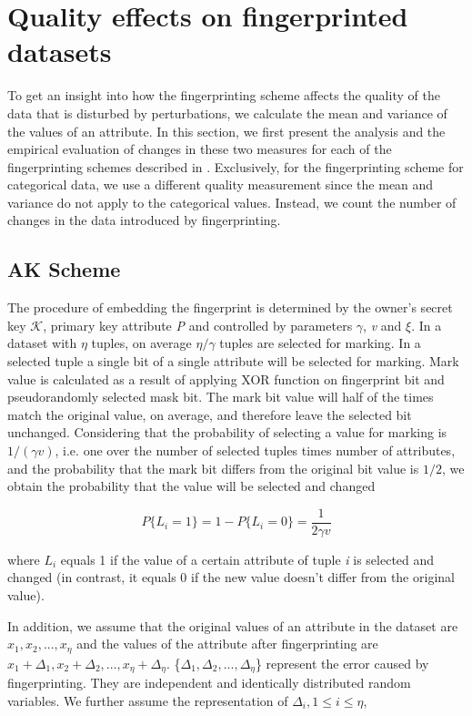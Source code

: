 
\section{Quality effects on fingerprinted datasets}\label{sec:quality}
To get an insight into how the fingerprinting scheme affects the quality of the data that is disturbed by perturbations, we calculate the mean and variance of the values of an attribute. 
In this section, we first present the analysis and the empirical evaluation of changes in these two measures for each of the fingerprinting schemes described in . 
Exclusively, for the fingerprinting scheme for categorical data, we use a different quality measurement since the mean and variance do not apply to the categorical values. 
Instead, we count the number of changes in the data introduced by fingerprinting. 

\subsection{AK Scheme}
The procedure of embedding the fingerprint is determined by the owner's secret key $\mathcal{K}$, primary key attribute \textit{P} and controlled by parameters $\gamma$, \textit{v} and $\xi$.
In a dataset with $\eta$ tuples, on average $\eta/\gamma$ tuples are selected for marking. 
In a selected tuple a single bit of a single attribute will be selected for marking. 
Mark value is calculated as a result of applying XOR function on fingerprint bit and pseudorandomly selected mask bit.
The mark bit value will half of the times match the original value, on average, and therefore leave the selected bit unchanged.
Considering that the probability of selecting a value for marking is $1/(\gamma v)$, i.e. one over the number of selected tuples times number of attributes, and the probability that the mark bit differs from the original bit value is $1/2$, we obtain the probability that the value will be selected and changed

\begin{equation}
    P\{L_i=1\} = 1 - P\{L_i=0\} = \frac{1}{2\gamma v}
\end{equation}

where $L_i$ equals 1 if the value of a certain attribute of tuple \textit{i} is selected and changed (in contrast, it equals 0 if the new value doesn't differ from the original value).

In addition, we assume that the original values of an attribute in the dataset are $x_1,x_2,...,x_{\eta}$ and the values of the attribute after fingerprinting are $x_1+\Delta_1,x_2+\Delta_2,...,x_{\eta}+\Delta_{\eta}$. 
\{$\Delta_1,\Delta_2,...,\Delta_\eta$\} represent the error caused by fingerprinting.
They are independent and identically distributed random variables. 
We further assume the representation of $\Delta_i, 1 \leq i \leq \eta$, 

